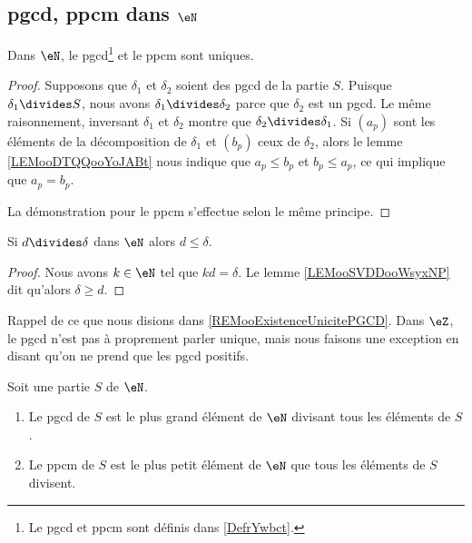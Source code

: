 \subsection{pgcd, ppcm dans \( \eN\)}


\begin{lemma}       \label{LEMooBJVJooFyuFeN}
	Dans \( \eN\), le pgcd\footnote{Le pgcd et ppcm sont définis dans \ref{DefrYwbct}.} et le ppcm sont uniques.
\end{lemma}

\begin{proof}
	Supposons que \( \delta_1\) et \( \delta_2\) soient des pgcd de la partie \( S\). Puisque \( \delta_1\divides S\), nous avons \( \delta_1\divides \delta_2\) parce que \( \delta_2\) est un pgcd. Le même raisonnement, inversant \( \delta_1\) et \( \delta_2\) montre que \( \delta_2\divides \delta_1\). Si \( (a_p)\) sont les éléments de la décomposition de \( \delta_1\) et \( (b_p)\) ceux de \( \delta_2\), alors le lemme \ref{LEMooDTQQooYoJABt} nous indique que \( a_p\leq b_p\) et \( b_p\leq a_p\), ce qui implique que \( a_p=b_p\).

	La démonstration pour le ppcm s'effectue selon le même principe.
\end{proof}

\begin{lemma}	\label{LEMooWMZWooCmkOoD}
	Si \(d\divides\delta \) dans \( \eN\) alors \( d\leq \delta\).
\end{lemma}

\begin{proof}
	Nous avons \( k\in \eN\) tel que \( kd=\delta\). Le lemme \ref{LEMooSVDDooWsyxNP} dit qu'alors \( \delta\geq d\).
\end{proof}

\begin{normaltext}		\label{NORMooNAMKooCKKZMc}
	Rappel de ce que nous disions dans \ref{REMooExistenceUnicitePGCD}. Dans \( \eZ\), le pgcd n'est pas à proprement parler unique, mais nous faisons une exception en disant qu'on ne prend que les pgcd positifs.
\end{normaltext}

\begin{lemma}       \label{LEMooJIGRooARiIPC}
	Soit une partie \( S\) de \( \eN\).
	\begin{enumerate}
		\item
		      Le pgcd de \( S\) est le plus grand élément de \( \eN\) divisant tous les éléments de \( S\).
		\item
		      Le ppcm de \( S\) est le plus petit élément de \( \eN\) que tous les éléments de \( S\) divisent.
	\end{enumerate}
\end{lemma}

